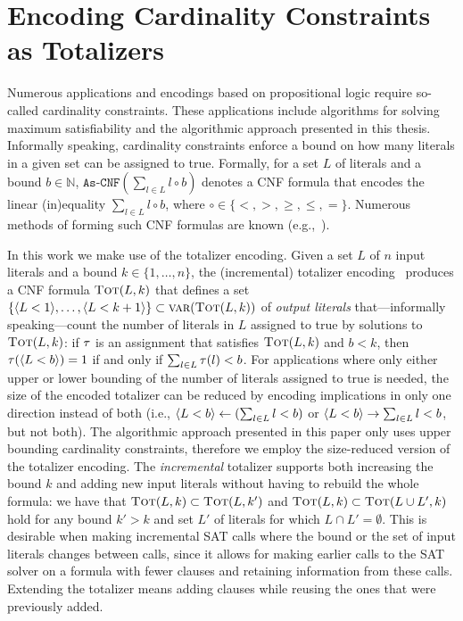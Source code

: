 \section{Encoding Cardinality Constraints as Totalizers\label{sec:card-const}}


Numerous applications and encodings based on propositional logic require so-called cardinality constraints.
These applications include algorithms for solving maximum satisfiability and the algorithmic approach presented in this thesis.
Informally speaking, cardinality constraints enforce a bound on how many literals in a given set can be assigned to true.
Formally, for a set $L$ of literals and a bound $b \in \mathbb{N}$, $\texttt{As-CNF}\left(\sum_{l \in L} l \circ b\right)$ denotes a CNF formula that encodes the linear (in)equality $\sum_{l \in L} l \circ b$, where $\circ \in \{< ,> ,\geq, \leq, =\}$.
Numerous methods of forming such CNF formulas are known (e.g.,~\autocites{DBLP:conf/cp/BailleuxB03,DBLP:conf/cp/Sinz05,DBLP:journals/jsat/EenS06}).

In this work we make use of the totalizer encoding.
Given a set $L$ of $n$ input literals and a bound $k\in\{1,\dots,n\}$, the (incremental) totalizer encoding~\autocites{DBLP:conf/cp/BailleuxB03,DBLP:conf/cp/MartinsJML14} produces a CNF formula $\textsc{Tot}(L, k)$ that defines a set $\{\langle L < 1 \rangle, \ldots, \langle L < k+1 \rangle\} \subset \textsc{var}(\textsc{Tot}(L,k))$ of \emph{output literals} that---informally speaking---count the number of literals in $L$ assigned to true by solutions to $\textsc{Tot}(L,k)$:
if $\tau$ is an assignment that satisfies $\textsc{Tot}(L,k)$ and $b < k$, then $\tau(\langle L < b \rangle) = 1$ if and only if $\sum_{l \in L} \tau(l) < b$.
For applications where only either upper or lower bounding of the number of literals assigned to true is needed, the size of the encoded totalizer can be reduced by encoding implications in only one direction instead of both (i.e., $\langle L < b \rangle \leftarrow (\sum_{l \in L} l < b)$ or $\langle L < b \rangle \rightarrow \sum_{l \in L} l < b$, but not both).
The algorithmic approach presented in this paper only uses upper bounding cardinality constraints, therefore we employ the size-reduced version of the totalizer encoding.
The \emph{incremental} totalizer supports both increasing the bound $k$ and adding new input literals without having to rebuild the whole formula:
we have that $\textsc{Tot}(L, k) \subset \textsc{Tot}(L, k')$ and $\textsc{Tot}(L, k) \subset  \textsc{Tot}(L \cup L', k)$ hold for any bound $k' > k$ and set $L'$ of literals for which $L \cap L' =  \emptyset$. 
This is desirable when making incremental SAT calls where the bound or the set of input literals changes between calls, since it allows for making earlier calls to the SAT solver on a formula with fewer clauses and retaining information from these calls.
Extending the totalizer means adding clauses while reusing the ones that were previously added.

